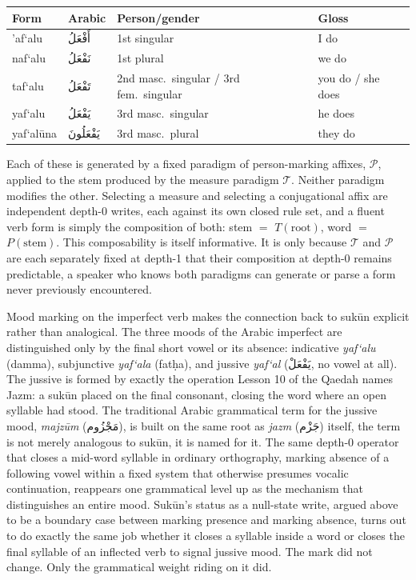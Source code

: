 \documentclass[11pt]{article}
\newcommand{\ar}[1]{\textarabic{#1}}
\begin{document}
\begin{center}
\begin{tabular}{llll}
Form & Arabic & Person/gender & Gloss \\ \hline
'af`alu & \ar{أَفْعَلُ} & 1st singular & I do \\
naf`alu & \ar{نَفْعَلُ} & 1st plural & we do \\
taf`alu & \ar{تَفْعَلُ} & 2nd masc.\ singular / 3rd fem.\ singular & you do / she does \\
yaf`alu & \ar{يَفْعَلُ} & 3rd masc.\ singular & he does \\
yaf`al\=una & \ar{يَفْعَلُونَ} & 3rd masc.\ plural & they do \\
\end{tabular}
\end{center}

Each of these is generated by a fixed paradigm of person-marking affixes,
$\mathcal{P}$, applied to the stem produced by the measure paradigm
$\mathcal{T}$. Neither paradigm modifies the other. Selecting a measure and
selecting a conjugational affix are independent depth-0 writes, each against
its own closed rule set, and a fluent verb form is simply the composition of
both: stem $=$ $T(\text{root})$, word $=$ $P(\text{stem})$. This composability
is itself informative. It is only because $\mathcal{T}$ and $\mathcal{P}$ are
each separately fixed at depth-1 that their composition at depth-0 remains
predictable, a speaker who knows both paradigms can generate or parse a form
never previously encountered.

Mood marking on the imperfect verb makes the connection back to sukūn
explicit rather than analogical. The three moods of the Arabic imperfect are
distinguished only by the final short vowel or its absence: indicative
\emph{yaf`alu} (damma), subjunctive \emph{yaf`ala} (fatḥa), and jussive
\emph{yaf`al} (\ar{يَفْعَلْ}, no vowel at all). The jussive is formed by exactly the
operation Lesson 10 of the Qaedah names Jazm: a sukūn placed on the final
consonant, closing the word where an open syllable had stood. The
traditional Arabic grammatical term for the jussive mood, \emph{majz\=um}
(\ar{مَجْزُوم}),
is built on the same root as \emph{jazm} (\ar{جَزْم}) itself, the term is not merely
analogous to sukūn, it is named for it. The same depth-0 operator that
closes a mid-word syllable in ordinary orthography, marking absence of a
following vowel within a fixed system that otherwise presumes vocalic
continuation, reappears one grammatical level up as the mechanism that
distinguishes an entire mood. Sukūn's status as a null-state write, argued
above to be a boundary case between marking presence and marking absence,
turns out to do exactly the same job whether it closes a syllable inside a
word or closes the final syllable of an inflected verb to signal jussive
mood. The mark did not change. Only the grammatical weight riding on it did.
\end{document}
